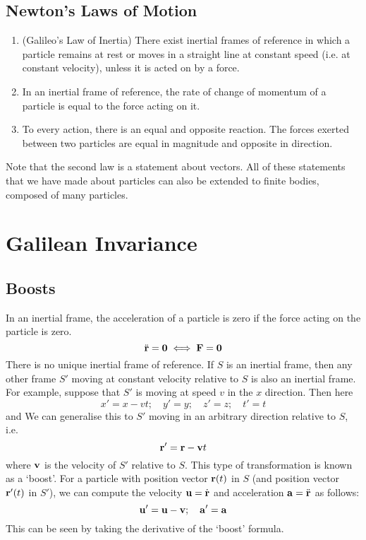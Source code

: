 \documentclass{article}
\begin{document}
\subsection{Newton's Laws of Motion}
\begin{enumerate}
    \item (Galileo's Law of Inertia) There exist inertial frames of reference in which a particle remains at rest or moves in a straight line at constant speed (i.e. at constant velocity), unless it is acted on by a force.
    \item In an inertial frame of reference, the rate of change of momentum of a particle is equal to the force acting on it.
    \item To every action, there is an equal and opposite reaction. The forces exerted between two particles are equal in magnitude and opposite in direction.
\end{enumerate}
Note that the second law is a statement about vectors. All of these statements that we have made about particles can also be extended to finite bodies, composed of many particles.

\section{Galilean Invariance}
\subsection{Boosts}
In an inertial frame, the acceleration of a particle is zero if the force acting on the particle is zero.
\[ \ddot{\vb r} = \vb 0 \iff \vb F = \vb 0 \]
There is no unique inertial frame of reference. If $S$ is an inertial frame, then any other frame $S'$ moving at constant velocity relative to $S$ is also an inertial frame. For example, suppose that $S'$ is moving at speed $v$ in the $x$ direction. Then here
\[ x'=x-vt;\quad y'=y;\quad z'=z;\quad t'=t \]
and
We can generalise this to $S'$ moving in an arbitrary direction relative to $S$, i.e.
\[ \vb r' = \vb r - \vb v t \]
where $\vb v$ is the velocity of $S'$ relative to $S$. This type of transformation is known as a `boost'. For a particle with position vector $\vb r(t)$ in $S$ (and position vector $\vb r'(t)$ in $S'$), we can compute the velocity $\vb u = \dot{\vb r}$ and acceleration $\vb a = \ddot{\vb r}$ as follows:
\[ \vb u' = \vb u - \vb v;\quad \vb a' = \vb a \]
This can be seen by taking the derivative of the `boost' formula.
\end{document}

